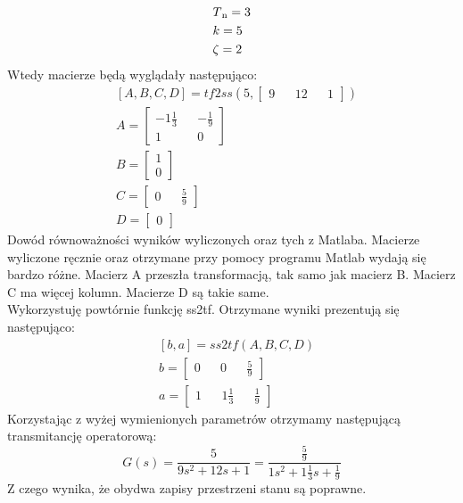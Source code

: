 \documentclass[a4paper,10pt]{article}
\begin{document}
\begin{itemize}
\begin{itemize}
\begin{equation}
	\begin{split}
	&T\textsubscript n = 3\\
	&k = 5\\
	&\zeta = 2
	\end{split}
	\end{equation}
	Wtedy macierze będą wyglądały następująco:
	\begin{equation}
	\begin{split}
	&[A, B, C, D]
	= tf2ss(5, \begin{bmatrix}
	9 && 12 && 1
	\end{bmatrix})\\
	&A =
	\begin{bmatrix}
	-1\frac{1}{3} && -\frac{1}{9}\\
	1 && 0
	\end{bmatrix}\\
	&B =
	\begin{bmatrix}
	1\\
	0
	\end{bmatrix}\\
	&C =
	\begin{bmatrix}
	0 && \frac{5}{9}
	\end{bmatrix}\\
	&D =
	\begin{bmatrix}
	0
	\end{bmatrix}
	\end{split}
	\end{equation}
	\newline Dowód równoważności wyników wyliczonych oraz tych z Matlaba.
	\newline\newline Macierze wyliczone ręcznie oraz otrzymane przy pomocy programu Matlab wydają się bardzo różne.
	Macierz A przeszła transformacją, tak samo jak macierz B. Macierz C ma więcej kolumn.
	Macierze D są takie same.\\
	Wykorzystuję powtórnie funkcję ss2tf.
	Otrzymane wyniki prezentują się następująco:
	\begin{equation}
	\begin{split}
		&[b,a]
		= ss2tf(A, B, C, D)\\
		&b = \begin{bmatrix}
		0 && 0 && \frac{5}{9}
		\end{bmatrix}\\
		&a = \begin{bmatrix}
		1 && 1\frac{1}{3} && \frac{1}{9}
		\end{bmatrix}
	\end{split}
	\end{equation}
	Korzystając z wyżej wymienionych parametrów otrzymamy następującą transmitancję operatorową:
	\begin{equation}
	G(s) = \frac{5}{9s^2 + 12s + 1} = \frac{\frac{5}{9}}{1s^2 + 1\frac{1}{3}s + \frac{1}{9}}
	\end{equation}
	Z czego wynika, że obydwa zapisy przestrzeni stanu są poprawne.
\end{itemize}


\end{itemize}
\end{document}
